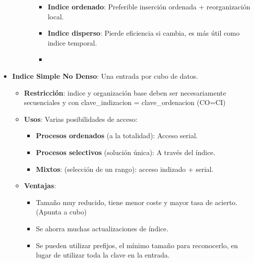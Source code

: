 \documentclass[12pt, twoside, openright]{report} %
\begin{document}
\begin{itemize}
\begin{itemize}
\begin{itemize}
        \begin{itemize}
        \item \textbf{Indice ordenado}: Preferible inserción ordenada +
          reorganización local.
          
        \item \textbf{Indice disperso}: Pierde eficiencia si cambia, es más
          útil como indice temporal.
          \item 
        \end{itemize}
      \end{itemize}
    \end{itemize}
  \item \textbf{Indice Simple No Denso}: Una entrada por cubo de datos.
    

    \begin{itemize}
    \item \textbf{Restricción}: indice y organización base deben ser
      necesariamente secuenciales y con clave\_indizacion =
      clave\_ordenacion (CO=CI)
      
    \item \textbf{Usos}: Varias posibilidades de acceso:
      

      \begin{itemize}
      \item \textbf{Procesos ordenados} (a la totalidad): Acceso serial.
        
      \item \textbf{Procesos selectivos} (solución única): A través del
        índice.
        
      \item \textbf{Mixtos}: (selección de un rango): acceso indizado +
        serial.
        
      \end{itemize}
    \item \textbf{Ventajas}:
      

      \begin{itemize}
      \item Tamaño muy reducido, tiene menor coste y mayor tasa de acierto.
        (Apunta a cubo)
        
      \item Se ahorra muchas actualizaciones de índice.
        
      \item Se pueden utilizar prefijos, el mínimo tamaño para reconocerlo,
        en lugar de utilizar toda la clave en la entrada.
        

\end{itemize}
\end{itemize}
\end{itemize}
\end{document}
